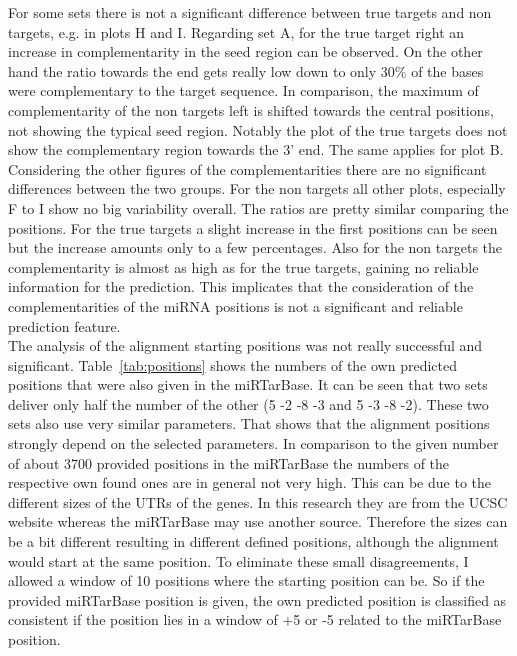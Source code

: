 \documentclass[12pt]{article}
\begin{document}
For some sets there is not a significant difference between true targets and non targets, e.g. in plots H and I. Regarding set A, for the true target right an increase in complementarity in the seed region can be observed. On the other hand the ratio towards the end gets really low down to only 30\% of the bases were complementary to the target sequence. In comparison, the maximum of complementarity of the non targets left is shifted towards the central positions, not showing the typical seed region. Notably the plot of the true targets does not show the complementary region towards the 3' end. The same applies for plot B. Considering the other figures of the complementarities there are no significant differences between the two groups. For the non targets all other plots, especially F to I show no big variability overall. The ratios are pretty similar comparing the positions. For the true targets a slight increase in the first positions can be seen but the increase amounts only to a few percentages.
Also for the non targets the complementarity is almost as high as for the true targets, gaining no reliable information for the prediction. This implicates that the consideration of the complementarities of the miRNA positions is not a significant and reliable prediction feature.\\

The analysis of the alignment starting positions was not really successful and significant. Table~\ref{tab:positions} shows the numbers of the own predicted positions that were also given in the miRTarBase. It can be seen that two sets deliver only half the number of the other (5 -2 -8 -3 and 5 -3 -8 -2). These two sets also use very similar parameters. That shows that the alignment positions strongly depend on the selected parameters. In comparison to the given number of about 3700 provided positions in the miRTarBase the numbers of the respective own found ones are in general not very high. This can be due to the different sizes of the UTRs of the genes. In this research they are from the UCSC website whereas the miRTarBase may use another source. Therefore the sizes can be a bit different resulting in different defined positions, although the alignment would start at the same position. To eliminate these small disagreements, I allowed a window of 10 positions where the starting position can be. So if the provided miRTarBase position is given, the own predicted position is classified as consistent if the position lies in a window of +5 or -5 related to the miRTarBase position. 
\end{document}
